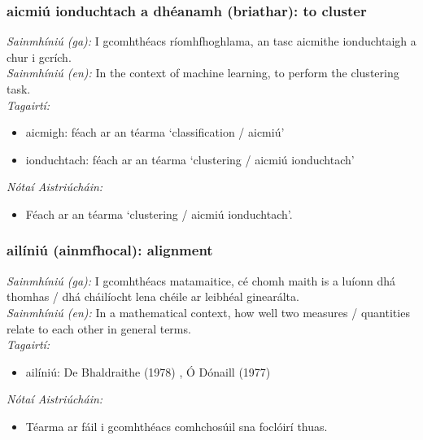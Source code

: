 \documentclass{article}
\begin{document}
\subsubsection*{aicmiú ionduchtach a dhéanamh (briathar): to cluster}
 \noindent \textit{Sainmhíniú (ga):} I gcomhthéacs ríomhfhoghlama, an tasc aicmithe ionduchtaigh a chur i gcrích.
\\
 \noindent \textit{Sainmhíniú (en):} In the context of machine learning, to perform the clustering task.
\\
 \noindent \textit{Tagairtí:}
\begin{itemize}
	\item aicmigh: féach ar an téarma `classification / aicmiú'
	\item ionduchtach: féach ar an téarma `clustering / aicmiú ionduchtach'
\end{itemize}

 \noindent \textit{Nótaí Aistriúcháin:}
\begin{itemize}
	\item Féach ar an téarma `clustering / aicmiú ionduchtach'.
\end{itemize}


\subsubsection*{ailíniú (ainmfhocal): alignment}
 \noindent \textit{Sainmhíniú (ga):} I gcomhthéacs matamaitice, cé chomh maith is a luíonn dhá thomhas / dhá cháilíocht lena chéile ar leibhéal ginearálta.
\\
 \noindent \textit{Sainmhíniú (en):} In a mathematical context, how well two measures / quantities relate to each other in general terms.
\\
 \noindent \textit{Tagairtí:}
\begin{itemize}
	\item ailíniú: De Bhaldraithe (1978) \cite{de-bhaldraithe}, Ó Dónaill (1977) \cite{odonaill}
\end{itemize}

 \noindent \textit{Nótaí Aistriúcháin:}
\begin{itemize}
	\item Téarma ar fáil i gcomhthéacs comhchosúil sna foclóirí thuas.
\end{itemize}
\end{document}

